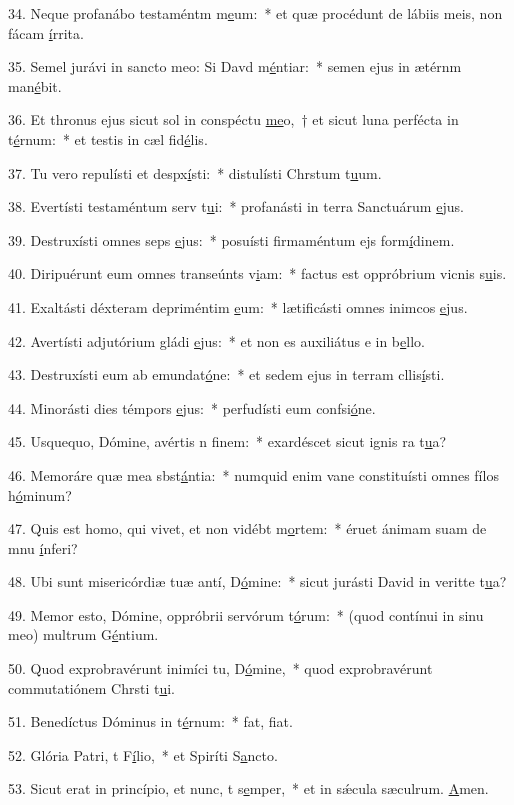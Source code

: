 34. Neque profanábo testaméntm m\uline{e}um:~* et quæ procédunt de lábiis meis, non fácam \uline{í}rrita.\par 
35. Semel jurávi in sancto meo: Si Davd m\uline{é}ntiar:~* semen ejus in ætérnm man\uline{é}bit.\par 
36. Et thronus ejus sicut sol in conspéctu \uline{me}o,~† et sicut luna perfécta in t\uline{é}rnum:~* et testis in cæl fid\uline{é}lis.\par 
37. Tu vero repulísti et despx\uline{í}sti:~* distulísti Chrstum t\uline{u}um.\par 
38. Evertísti testaméntum serv t\uline{u}i:~* profanásti in terra Sanctuárum \uline{e}jus.\par 
39. Destruxísti omnes seps \uline{e}jus:~* posuísti firmaméntum ejs form\uline{í}dinem.\par 
40. Diripuérunt eum omnes transeúnts v\uline{i}am:~* factus est oppróbrium vicnis s\uline{u}is.\par 
41. Exaltásti déxteram depriméntim \uline{e}um:~* lætificásti omnes inimcos \uline{e}jus.\par 
42. Avertísti adjutórium gládi \uline{e}jus:~* et non es auxiliátus e in b\uline{e}llo.\par 
43. Destruxísti eum ab emundat\uline{ó}ne:~* et sedem ejus in terram cllis\uline{í}sti.\par 
44. Minorásti dies témpors \uline{e}jus:~* perfudísti eum confsi\uline{ó}ne.\par 
45. Usquequo, Dómine, avértis n f\uline{i}nem:~* exardéscet sicut ignis ra t\uline{u}a?\par 
46. Memoráre quæ mea sbst\uline{á}ntia:~* numquid enim vane constituísti omnes fílos h\uline{ó}minum?\par 
47. Quis est homo, qui vivet, et non vidébt m\uline{o}rtem:~* éruet ánimam suam de mnu \uline{í}nferi?\par 
48. Ubi sunt misericórdiæ tuæ antí, D\uline{ó}mine:~* sicut jurásti David in veritte t\uline{u}a?\par 
49. Memor esto, Dómine, oppróbrii servórum t\uline{ó}rum:~* (quod contínui in sinu meo) multrum G\uline{é}ntium.\par 
50. Quod exprobravérunt inimíci tu, D\uline{ó}mine,~* quod exprobravérunt commutatiónem Chrsti t\uline{u}i.\par 
51. Benedíctus Dóminus in t\uline{é}rnum:~* fat, f\uline{i}at.\par 
52. Glória Patri, t F\uline{í}lio,~* et Spiríti S\uline{a}ncto.\par 
53. Sicut erat in princípio, et nunc, t s\uline{e}mper,~* et in sǽcula sæculrum. \uline{A}men.\par 
